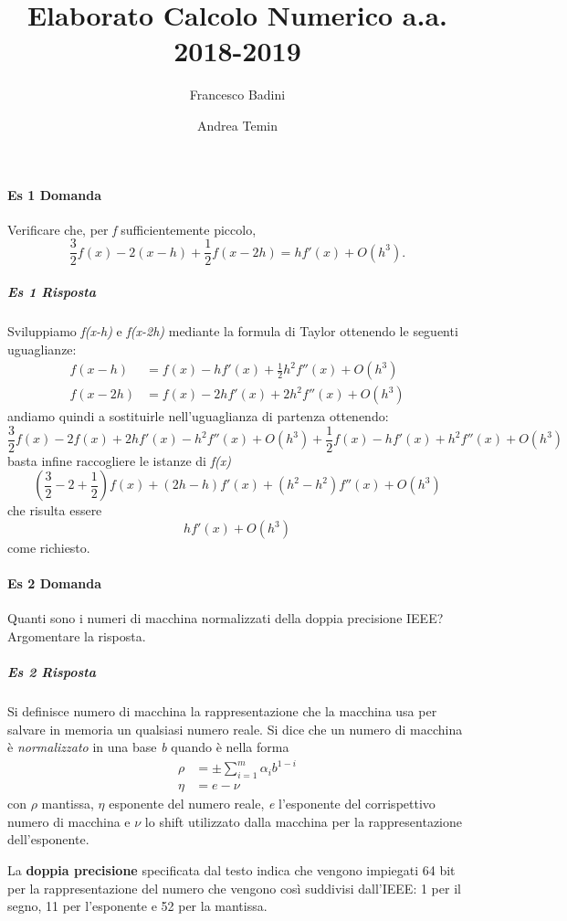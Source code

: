 \documentclass[a4paper]{report}
\begin{document}
\author{Francesco Badini \and Andrea Temin}
\title{Elaborato Calcolo Numerico a.a. 2018-2019}
\maketitle
\paragraph{Es 1 Domanda}	
Verificare che, per \emph{f} sufficientemente piccolo,
\[
\frac{3}{2}f(x)-2(x-h)+\frac{1}{2}f(x-2h) = hf'(x)+O(h^3). 
\]
\subparagraph{Es 1 Risposta}
Sviluppiamo \emph{f(x-h)} e \emph{f(x-2h)} mediante la formula di Taylor ottenendo le seguenti uguaglianze:
\[
\begin{aligned}
f(x-h) &= f(x)-hf'(x)+\frac{1}{2}h^2f''(x)+O(h^3) \\
f(x-2h) &= f(x)-2hf'(x)+2h^2f''(x)+O(h^3)
\end{aligned}
\]
andiamo quindi a sostituirle nell'uguaglianza di partenza ottenendo:
\[
\frac{3}{2}f(x)-2f(x)+2hf'(x)-h^2f''(x)+O(h^3)+\frac{1}{2}f(x)-hf'(x)+h^2f''(x)+O(h^3)
\]
basta infine raccogliere le istanze di \emph{f(x)}
\[
\left(\frac{3}{2}-2+\frac{1}{2}\right)f(x)+(2h-h)f'(x)+(h^2-h^2)f''(x)+O(h^3)
\]
che risulta essere
\[
hf'(x) + O(h^3)
\]
come richiesto.
\\
\paragraph{Es 2 Domanda}	
Quanti sono i numeri di macchina normalizzati della doppia precisione IEEE? Argomentare la risposta.
\subparagraph{Es 2 Risposta}
Si definisce numero di macchina la rappresentazione che la macchina usa per salvare in memoria un qualsiasi numero reale. Si dice che un numero di macchina è \emph{normalizzato} in una base \emph{b} quando è nella forma
\[
\begin{aligned}
\rho &=\pm\sum_{i=1}^m \alpha_ib^{1-i} \\
\eta &= e-\nu
\end{aligned}
\]
con $\rho$ mantissa, $\eta$ esponente del numero reale, \emph{e} l'esponente del corrispettivo numero di macchina e $\nu$ lo shift utilizzato dalla macchina per la rappresentazione dell'esponente.

La \textbf{doppia precisione} specificata dal testo indica che vengono impiegati 64 bit per la rappresentazione del numero che vengono così suddivisi dall'IEEE: 1 per il segno, 11 per l'esponente e 52 per la mantissa.
\end{document}
